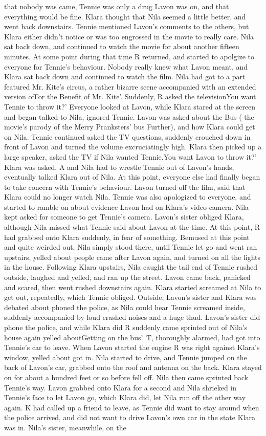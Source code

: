 \documentclass[12pt]{book}
\begin{document}
that nobody was came, Tennie was only a drug Lavon was on, and that everything would be fine. Klara thought that Nila seemed a little better, and went back downstairs. Tennie mentioned Lavon's comments to the others, but Klara either didn't notice or was too engrossed in the movie to really care. Nila sat back down, and continued to watch the movie for about another fifteen minutes. At some point during that time R returned, and started to apolgize to everyone for Tennie's behaviour. Nobody really knew what Lavon meant, and Klara sat back down and continued to watch the film. Nila had got to a part featured Mr. Kite's circus, a rather bizarre scene accompanied with an extended version ofFor the Benefit of Mr. Kite'. Suddenly, R asked the televisionYou want Tennie to throw it?' Everyone looked at Lavon, while Klara stared at the screen and began talked to Nila, ignored Tennie. Lavon was asked about the Bus ( the movie's parody of the Merry Pranksters' bus Further), and how Klara could get on Nila. Tennie continued asked the TV questions, suddenly crouched down in front of Lavon and turned the volume excruciatingly high. Klara then picked up a large speaker, asked the TV if Nila wanted Tennie.You want Lavon to throw it?' Klara was asked. A and Nila had to wrestle Tennie out of Lavon's hands, eventually talked Klara out of Nila. At this point, everyone else had finally began to take concern with Tennie's behaviour. Lavon turned off the film, said that Klara could no longer watch Nila. Tennie was also apologized to everyone, and started to ramble on about evidence Lavon had on Klara's video camera. Nila kept asked for someone to get Tennie's camera. Lavon's sister obliged Klara, although Nila missed what Tennie said about Lavon at the time. At this point, R had grabbed onto Klara suddenly, in fear of something. Bemused at this point and quite weirded out, Nila simply stood there, until Tennie let go and went ran upstairs, yelled about people came after Lavon again, and turned on all the lights in the house. Following Klara upstairs, Nila caught the tail end of Tennie rushed outside, laughed and yelled, and ran up the street. Lavon came back, panicked and scared, then went rushed downstairs again. Klara started screamed at Nila to get out, repeatedly, which Tennie obliged. Outside, Lavon's sister and Klara was debated about phoned the police, as Nila could hear Tennie screamed inside, suddenly accompanied by loud crashed noises and a huge thud. Lavon's sister did phone the police, and while Klara did R suddenly came sprinted out of Nila's house again yelled aboutGetting on the bus'. T, thoroughly alarmed, had got into Tennie's car to leave. When Lavon started the engine R was right against Klara's window, yelled about got in. Nila started to drive, and Tennie jumped on the back of Lavon's car, grabbed onto the roof and antenna on the back. Klara stayed on for about a hundred feet or so before fell off. Nila then came sprinted back Tennie's way. Lavon grabbed onto Klara for a second and Nila shrieked in Tennie's face to let Lavon go, which Klara did, let Nila run off the other way again. K had called up a friend to leave, as Tennie did want to stay around when the police arrived, and did not want to drive Lavon's own car in the state Klara was in. Nila's sister, meanwhile, on the 
\end{document}
